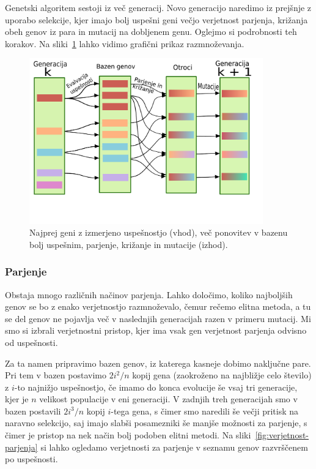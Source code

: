 Genetski algoritem sestoji iz več generacij. Novo generacijo naredimo iz prejšnje z uporabo selekcije, kjer imajo bolj uspešni geni večjo verjetnost parjenja, križanja obeh genov iz para in mutacij na dobljenem genu. Oglejmo si podrobnosti teh korakov. Na sliki~\ref{fig:genetski} lahko vidimo grafični prikaz razmnoževanja.

\begin{figure}[ht]  %
	\centering
	\includegraphics[width=0.9\textwidth]{../poglavja/images/genetski.pdf}
	\caption[Razmnoževanje uspešnejših genov]{Najprej geni z izmerjeno uspešnostjo (vhod), več ponovitev v bazenu bolj uspešnim, parjenje, križanje in mutacije (izhod).} %
	\label{fig:genetski}
\end{figure}

\subsubsection{Parjenje} \label{parjenje}

Obstaja mnogo različnih načinov parjenja. Lahko določimo, koliko najboljših genov se bo z enako verjetnostjo razmnoževalo, čemur rečemo elitna metoda, a tu se del genov ne pojavlja več v naslednjih generacijah razen v primeru mutacij. Mi smo si izbrali verjetnostni pristop, kjer ima vsak gen verjetnost parjenja odvisno od uspešnosti.

Za ta namen pripravimo bazen genov, iz katerega kasneje dobimo naključne pare. Pri tem v bazen postavimo $2 i^2 / n$ kopij gena (zaokroženo na najbližje celo število) z $i$-to najnižjo uspešnostjo, če imamo do konca evolucije še vsaj tri generacije, kjer je $n$ velikost populacije v eni generaciji. V zadnjih treh generacijah smo v bazen postavili $2 i^3 / n$ kopij $i$-tega gena, s čimer smo naredili še večji pritisk na naravno selekcijo, saj imajo slabši posamezniki še manjše možnosti za parjenje, s čimer je pristop na nek način bolj podoben elitni metodi. Na sliki~\ref{fig:verjetnost-parjenja} si lahko ogledamo verjetnosti za parjenje v seznamu genov razvrščenem po uspešnosti.

